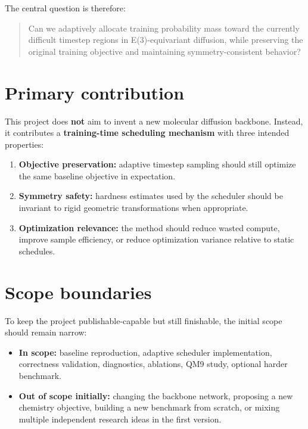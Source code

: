 \documentclass[11pt]{report}
\begin{document}
The central question is therefore:

\begin{quote}
Can we adaptively allocate training probability mass toward the currently difficult timestep regions in E(3)-equivariant diffusion, while preserving the original training objective and maintaining symmetry-consistent behavior?
\end{quote}

\section{Primary contribution}

This project does \textbf{not} aim to invent a new molecular diffusion backbone. Instead, it contributes a \textbf{training-time scheduling mechanism} with three intended properties:

\begin{enumerate}[leftmargin=2em]
    \item \textbf{Objective preservation:} adaptive timestep sampling should still optimize the same baseline objective in expectation.
    \item \textbf{Symmetry safety:} hardness estimates used by the scheduler should be invariant to rigid geometric transformations when appropriate.
    \item \textbf{Optimization relevance:} the method should reduce wasted compute, improve sample efficiency, or reduce optimization variance relative to static schedules.
\end{enumerate}

\section{Scope boundaries}

To keep the project publishable-capable but still finishable, the initial scope should remain narrow:

\begin{itemize}[leftmargin=2em]
    \item \textbf{In scope:} baseline reproduction, adaptive scheduler implementation, correctness validation, diagnostics, ablations, QM9 study, optional harder benchmark.
    \item \textbf{Out of scope initially:} changing the backbone network, proposing a new chemistry objective, building a new benchmark from scratch, or mixing multiple independent research ideas in the first version.
\end{itemize}
\end{document}
